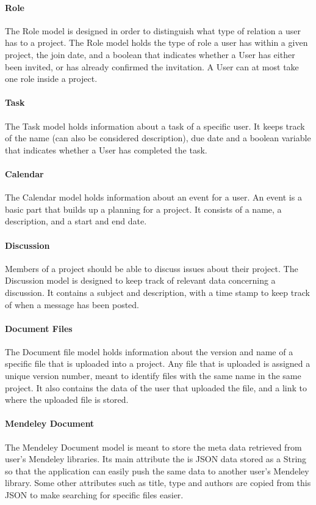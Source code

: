\paragraph{Role}

The Role model is designed in order to distinguish what type of relation a user has to a project. The Role model holds the type of role a user has within a given project, the join date, and a boolean that indicates whether a User has either been invited, or has already confirmed the invitation. A User can at most take one role inside a project. 

\paragraph{Task} %
The Task model holds information about a task of a specific user. It keeps track of the name (can also be considered description), due date and a boolean variable that indicates whether a User has completed the task.

\paragraph{Calendar} %
The Calendar model holds information about an event for a user. An event is a basic part that builds up a planning for a project. It consists of a name, a description, and a start and end date. 

\paragraph{Discussion} %
Members of a project should be able to discuss issues about their project. The Discussion model is designed to keep track of relevant data concerning a discussion. It contains a subject and description, with a time stamp to keep track of when a message has been posted. 

\paragraph{Document Files} %
The Document file model holds information about the version and name of a specific file that is uploaded into a project. Any file that is uploaded is assigned a unique version number, meant to identify files with the same name in the same project. It also contains the data of the user that uploaded the file, and a link to where the uploaded file is stored.

\paragraph{Mendeley Document} %
The Mendeley Document model is meant to store the meta data retrieved from user's Mendeley libraries. Its main attribute the is JSON data stored as a String so that the application can easily push the same data to another user's Mendeley library. Some other attributes such as title, type and authors are copied from this JSON to make searching for specific files easier.

